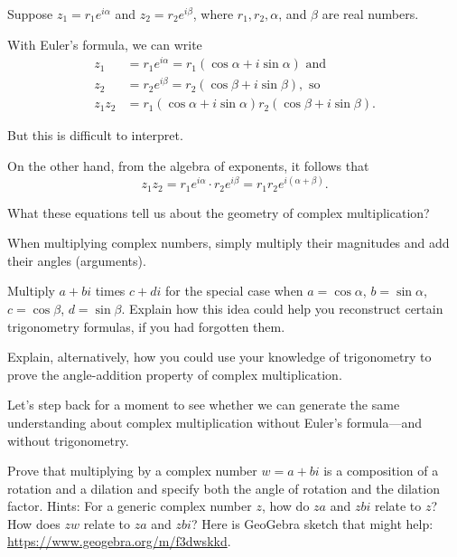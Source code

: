 \documentclass[handout,space,nooutcomes]{ximera}
\begin{document}
\begin{problem}
Suppose $z_1=r_1 e^{i\alpha}$ and $z_2=r_2 e^{i\beta}$, where $r_1, r_2, \alpha$, and $\beta$ are real numbers.  

With Euler's formula, we can write 
\begin{align*}
z_1& =r_1 e^{i\alpha}= r_1 (\cos\alpha + i\sin\alpha) \text{ and } \\
z_2& =r_2 e^{i\beta}=r_2(\cos\beta + i\sin\beta),  \text{ so } \\
z_1 z_2 & = r_1(\cos\alpha + i\sin\alpha)r_2(\cos\beta + i\sin\beta).
\end{align*}

But this is difficult to interpret.  

On the other hand, from the algebra of exponents, it follows that 
\[
z_1 z_2 = r_1e^{i\alpha}\cdot r_2 e^{i\beta}= r_1 r_2 e^{i(\alpha + \beta)}.  
\]


What these equations tell us about the geometry of complex multiplication?  
\begin{freeResponse}
\begin{hint}
When multiplying complex numbers, simply multiply their magnitudes and add their angles (arguments).  
\end{hint}
\end{freeResponse}
\end{problem}

\begin{problem}
Multiply $a + bi$ times $c + di$ for the special case when $a=\cos\alpha$, $b=\sin\alpha$, 
$c=\cos\beta$, $d=\sin\beta$.  Explain how this idea could help you reconstruct certain trigonometry formulas, if you had forgotten them.  

Explain, alternatively, how you could use your knowledge of trigonometry to prove the angle-addition property of complex multiplication.  
\end{problem}

%
%
Let's step back for a moment to see whether we can generate the same understanding about complex multiplication without Euler's formula---and without trigonometry.  
\begin{problem}
Prove that multiplying by a complex number $w = a + bi$ is a composition of a rotation and a dilation and specify both the angle of rotation and the dilation factor.  Hints: For a generic complex number $z$, how do $za$ and $zbi$ relate to $z$?  How does $zw$ relate to $za$ and $zbi$?   Here is GeoGebra sketch that might help: 
\url{https://www.geogebra.org/m/f3dwskkd}.  
\end{problem}
\end{document}
